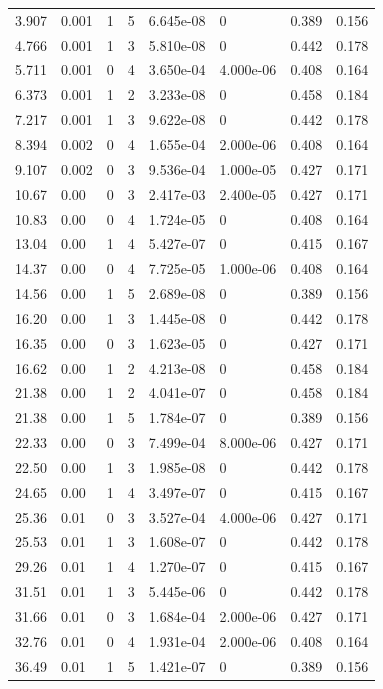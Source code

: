 \documentclass[preview]{standalone}
\begin{document}
{{\begin{tabular}{L{1.2cm}C{1.2cm} C{0.3cm}C{0.5cm} C{1.4cm}C{1.4cm} C{1.4cm}C{1.4cm}}
  3.907  &  0.001  & 1     &  5 &  6.645e-08  & 0  & 0.389 &  0.156   \\ 
  4.766  &  0.001  & 1     &  3 &  5.810e-08  & 0  & 0.442 &  0.178   \\ 
  5.711  &  0.001  & 0     &  4 &  3.650e-04  & 4.000e-06  & 0.408 &  0.164   \\ 
  6.373  &  0.001  & 1     &  2 &  3.233e-08  & 0  & 0.458 &  0.184   \\ 
  7.217  &  0.001  & 1     &  3 &  9.622e-08  & 0  & 0.442 &  0.178   \\ 
  8.394  &  0.002  & 0     &  4 &  1.655e-04  & 2.000e-06  & 0.408 &  0.164   \\ 
  9.107  &  0.002  & 0     &  3 &  9.536e-04  & 1.000e-05  & 0.427 &  0.171   \\ 
  10.67  &  0.00  & 0     &  3 &  2.417e-03  & 2.400e-05  & 0.427 &  0.171   \\ 
  10.83  &  0.00  & 0     &  4 &  1.724e-05  & 0  & 0.408 &  0.164   \\ 
  13.04  &  0.00  & 1     &  4 &  5.427e-07  & 0  & 0.415 &  0.167   \\ 
  14.37  &  0.00  & 0     &  4 &  7.725e-05  & 1.000e-06  & 0.408 &  0.164   \\ 
  14.56  &  0.00  & 1     &  5 &  2.689e-08  & 0  & 0.389 &  0.156   \\ 
  16.20  &  0.00  & 1     &  3 &  1.445e-08  & 0  & 0.442 &  0.178   \\ 
  16.35  &  0.00  & 0     &  3 &  1.623e-05  & 0  & 0.427 &  0.171   \\ 
  16.62  &  0.00  & 1     &  2 &  4.213e-08  & 0  & 0.458 &  0.184   \\ 
  21.38  &  0.00  & 1     &  2 &  4.041e-07  & 0  & 0.458 &  0.184   \\ 
  21.38  &  0.00  & 1     &  5 &  1.784e-07  & 0  & 0.389 &  0.156   \\ 
  22.33  &  0.00  & 0     &  3 &  7.499e-04  & 8.000e-06  & 0.427 &  0.171   \\ 
  22.50  &  0.00  & 1     &  3 &  1.985e-08  & 0  & 0.442 &  0.178   \\ 
  24.65  &  0.00  & 1     &  4 &  3.497e-07  & 0  & 0.415 &  0.167   \\ 
  25.36  &  0.01  & 0     &  3 &  3.527e-04  & 4.000e-06  & 0.427 &  0.171   \\ 
  25.53  &  0.01  & 1     &  3 &  1.608e-07  & 0  & 0.442 &  0.178   \\ 
  29.26  &  0.01  & 1     &  4 &  1.270e-07  & 0  & 0.415 &  0.167   \\ 
  31.51  &  0.01  & 1     &  3 &  5.445e-06  & 0  & 0.442 &  0.178   \\ 
  31.66  &  0.01  & 0     &  3 &  1.684e-04  & 2.000e-06  & 0.427 &  0.171   \\ 
  32.76  &  0.01  & 0     &  4 &  1.931e-04  & 2.000e-06  & 0.408 &  0.164   \\ 
  36.49  &  0.01  & 1     &  5 &  1.421e-07  & 0  & 0.389 &  0.156   \\ 
\hline 
\end{tabular} 

}}
\end{document}

